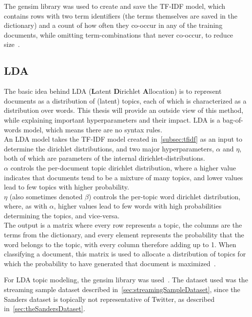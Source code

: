 The gensim library was used to create and save the TF-IDF model,
which contains rows with two term identifiers (the terms themselves are saved in the dictionary) and a count of how often
they co-occur in any of the training documents, while omitting term-combinations that never co-occur, to reduce size~\cite{gensimDocs}.

\subsection{LDA}
\label{subsec:lda}

The basic idea behind LDA (\textbf{L}atent \textbf{D}irichlet \textbf{A}llocation) is to represent documents as a distribution of (latent) topics,
each of which is characterized as a distribution over words.
This thesis will provide an outside view of this method, while explaining important hyperparameters and their impact.
LDA is a bag-of-words model, which means there are no syntax rules.\\
An LDA model takes the TF-IDF model created in~\cref{subsec:tfidf} as an input to determine the dirichlet distributions,
and two major hyperparameters, $\alpha$ and $\eta$,
both of which are parameters of the internal dirichlet-distributions.\\
$\alpha$ controls the per-document topic dirichlet distribution,
where a higher value indicates that documents tend to be a mixture of many topics,
and lower values lead to few topics with higher probability.\\
$\eta$ (also sometimes denoted $\beta$) controls the per-topic word dirichlet distribution, where, as with $\alpha$,
higher values lead to few words with high probabilities determining the topics,
and vice-versa.\\
The output is a matrix where every row represents a topic,
the columns are the terms from the dictionary,
and every element represents the probability that the word belongs to the topic,
with every column therefore adding up to 1.
When classifying a document, this matrix is used to allocate a distribution of topics for which the probability to have generated that document is maximized~\cite{Blei2003}.

For LDA topic modeling, the gensim library was used~\cite{gensimDocs}.
The dataset used was the streaming sample dataset described in~\cref{sec:streamingSampleDataset},
since the Sanders dataset is topically not representative of Twitter, as described in~\cref{sec:theSandersDataset}.

